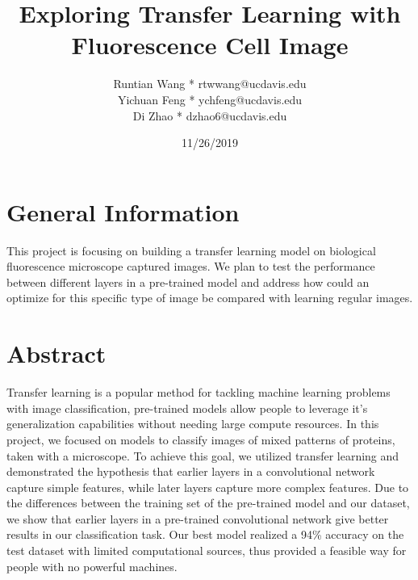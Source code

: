 \documentclass{article}
\begin{document}
\title{Exploring Transfer Learning with Fluorescence Cell Image}
\author{Runtian Wang * rtwwang@ucdavis.edu\\Yichuan Feng * ychfeng@ucdavis.edu\\Di Zhao * dzhao6@ucdavis.edu}
\date{11/26/2019}
\maketitle

\section{General Information}
This project is focusing on building a transfer learning model on biological fluorescence microscope captured images. We plan to test the performance between different layers in a pre-trained model and address how could an optimize for this specific type of image be compared with learning regular images. 

\section{Abstract}
Transfer learning is a popular method for tackling machine learning problems with image classification, 
pre-trained models allow people to leverage it's generalization capabilities without needing large compute resources. In this project, we focused on models to classify images of mixed patterns of proteins,
taken with a microscope. To achieve this goal, we utilized transfer learning and demonstrated the hypothesis that earlier layers in a convolutional network capture simple features,
while later layers capture more complex features. Due to the differences between the training set
of the pre-trained model and our dataset, we show that earlier layers in a pre-trained convolutional network
give better results in our classification task. Our best model realized a 94\% accuracy on the test dataset with limited computational sources, thus provided a feasible way for people with no powerful machines.
\end{document}

